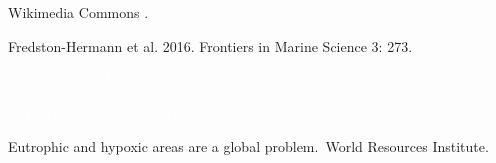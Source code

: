 \documentclass[t]{beamer}
\begin{document}
%
%
%
%

{
\begin{frame}[b]

\hfill \tiny Wikimedia Commons .
\end{frame}
}

{
\begin{frame}[b]

\hfill \tiny Fredston-Hermann et al. 2016. Frontiers in Marine Science 3: 273.
\end{frame}
}


{
\begin{frame}[b]

\hfill\tiny\textcolor{white}{Public domain, Wikimedia Commons.}
\end{frame}
}

{
\begin{frame}[b]%

\tiny\textcolor{white}{ Bill Meier, Flickr Creative Commons.}
\end{frame}
}

{
\begin{frame}[b]


\hspace*{122mm}
\end{frame}
}

{
\begin{frame}[b]{Eutrophic and hypoxic areas are a global problem.}
\hfill\tiny\textcopyright\,World Resources Institute.
\end{frame}
}
\end{document}
